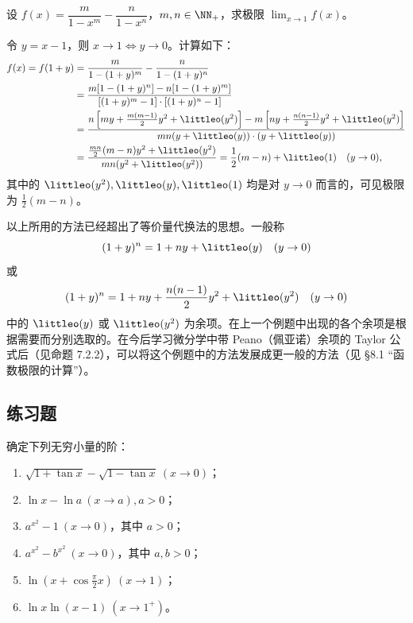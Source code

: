 \begin{xexample}[4.4.6]
设 $f(x)=\dfrac{m}{1-x^m}-\dfrac{n}{1-x^n}$，$m,n\in\NN_+$，求极限 $\displaystyle\lim_{x\to1}f(x)$。
\end{xexample}
\begin{xsolution}
令 $y=x-1$，则 $x\to1\Longleftrightarrow y\to0$。计算如下：
\begin{align*}
  f(x)=f(1+y)
  &=\frac{m}{1-(1+y)^m}-\frac{n}{1-(1+y)^n}\\
  &=\frac{m[1-(1+y)^n]-n[1-(1+y)^m]}
          {[(1+y)^m-1]\cdot[(1+y)^n-1]}\\
  &=\frac{n\left[my+\frac{m(m-1)}2y^2+\littleo(y^2)\right]
          -m\left[ny+\frac{n(n-1)}2y^2+\littleo(y^2)\right]}
          {mn(y+\littleo(y))\cdot(y+\littleo(y))}\\
  &=\frac{\frac{mn}2(m-n)y^2+\littleo(y^2)}{mn(y^2+\littleo(y^2))}
   =\frac12(m-n)+\littleo(1)\quad(y\to0),
\end{align*}
其中的 $\littleo(y^2),\littleo(y),\littleo(1)$ 均是对 $y\to0$ 而言的，可见极限为 $\frac12(m-n)$。
\end{xsolution}

\begin{xremark}
以上所用的方法已经超出了等价量代换法的思想。一般称
\[
  (1+y)^n=1+ny+\littleo(y)\quad(y\to0)
\]
或
\[
  (1+y)^n=1+ny+\frac{n(n-1)}2y^2+\littleo(y^2)\quad(y\to0)
\]
中的 $\littleo(y)$ 或 $\littleo(y^2)$ 为余项。在上一个例题中出现的各个余项是根据需要而分别选取的。在今后学习微分学中带 Peano（佩亚诺）余项的 Taylor 公式后（见命题 7.2.2），可以将这个例题中的方法发展成更一般的方法（见 §8.1 “函数极限的计算”）。
\end{xremark}

\subsection{练习题}

\begin{xexercise}[1]
确定下列无穷小量的阶：
  \begin{enumerate}
    \item $\sqrt{1+\tan x}-\sqrt{1-\tan x}\ (x\to0)$；
    \item $\ln x-\ln a\ (x\to a),a>0$；
    \item $a^{x^2}-1\ (x\to0)$，其中 $a>0$；
    \item $a^{x^2}-b^{x^2}\ (x\to0)$，其中 $a,b>0$；
    \item $\ln\left(x+\cos\frac\pi2x\right)\ (x\to1)$；
    \item $\ln x\ln(x-1)\ (x\to1^+)$。
  \end{enumerate}
\end{xexercise}

